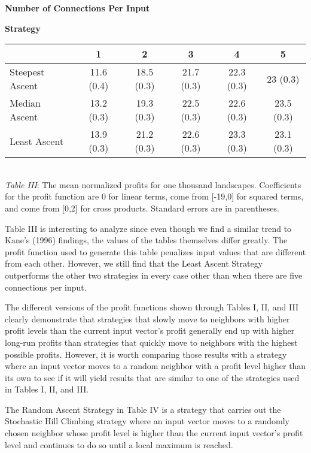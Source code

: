 \begin{center}
\hspace{2cm} \textbf{Number of Connections Per Input}
\begin{flushleft}
\hspace{2.5cm} \textbf{Strategy}
\end{flushleft}
\begin{Schunk}

\begin{tabular}{l|c|c|c|c|c}
\hline
  & 1 & 2 & 3 & 4 & 5\\
\hline
Steepest Ascent & 11.6 (0.4) & 18.5 (0.3) & 21.7 (0.3) & 22.3 (0.3) & 23 (0.3)\\
\hline
Median Ascent & 13.2 (0.3) & 19.3 (0.3) & 22.5 (0.3) & 22.6 (0.3) & 23.5 (0.3)\\
\hline
Least Ascent & 13.9 (0.3) & 21.2 (0.3) & 22.6 (0.3) & 23.3 (0.3) & 23.1 (0.3)\\
\hline
\end{tabular}

\end{Schunk}
\\
\emph{Table III}: The mean normalized profits for one thousand landscapes. Coefficients for the profit function are 0 for linear terms, come from [-19,0] for squared terms, and come from [0,2] for cross products. Standard errors are in parentheses.
\end{center}

Table III is interesting to analyze since even though we find a similar
trend to Kane's (1996) findings, the values of the tables themselves
differ greatly. The profit function used to generate this table
penalizes input values that are different from each other. However, we
still find that the Least Ascent Strategy outperforms the other two
strategies in every case other than when there are five connections per
input.

The different versions of the profit functions shown through Tables I,
II, and III clearly demonstrate that strategies that slowly move to
neighbors with higher profit levels than the current input vector's
profit generally end up with higher long-run profits than strategies
that quickly move to neighbors with the highest possible profits.
However, it is worth comparing those results with a strategy where an
input vector moves to a random neighbor with a profit level higher than
its own to see if it will yield results that are similar to one of the
strategies used in Tables I, II, and III.

The Random Ascent Strategy in Table IV is a strategy that carries out
the Stochastic Hill Climbing strategy where an input vector moves to a
randomly chosen neighbor whose profit level is higher than the current
input vector's profit level and continues to do so until a local maximum
is reached.

